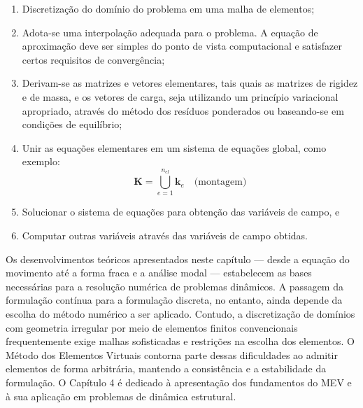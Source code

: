 \begin{enumerate}
    \item Discretização do domínio do problema em uma malha de elementos;
    \item Adota-se uma interpolação adequada para o problema. A equação de aproximação deve ser simples do ponto de vista computacional e satisfazer certos requisitos de convergência;
    \item Derivam-se as matrizes e vetores elementares, tais quais as matrizes de rigidez e de massa, e os vetores de carga, seja utilizando um princípio variacional apropriado, através do método dos resíduos ponderados ou baseando-se em condições de equilíbrio;
    \item Unir as equações elementares em um sistema de equações global, como exemplo: $$\mathbf{K} = \bigcup_{e=1}^{n_{el}} \mathbf{k}_e \quad \text{(montagem)} $$
    \item Solucionar o sistema de equações para obtenção das variáveis de campo, e
    \item Computar outras variáveis através das variáveis de campo obtidas.
\end{enumerate}

\indent Os desenvolvimentos teóricos apresentados neste capítulo — desde a equação do movimento até a forma fraca e a análise modal — estabelecem as bases necessárias para a resolução numérica de problemas dinâmicos. A passagem da formulação contínua para a formulação discreta, no entanto, ainda depende da escolha do método numérico a ser aplicado. Contudo, a discretização de domínios com geometria irregular por meio de elementos finitos convencionais frequentemente exige malhas sofisticadas e restrições na escolha dos elementos. O Método dos Elementos Virtuais contorna parte dessas dificuldades ao admitir elementos de forma arbitrária, mantendo a consistência e a estabilidade da formulação. O Capítulo 4 é dedicado à apresentação dos fundamentos do MEV e à sua aplicação em problemas de dinâmica estrutural.